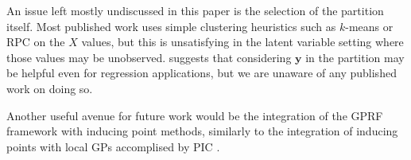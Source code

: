 \documentclass{article}
\renewcommand{\v}[1]{\mathbf{#1}}
\begin{document}
An issue left mostly undiscussed in this paper is the selection of the
partition itself. Most published work uses simple clustering
heuristics such as $k$-means \cite{tresp2000bayesian} or RPC
\cite{chalupka2012} on the $X$ values, but this is unsatisfying in the
latent variable setting where those values may be
unobserved. \cite{rasmussen2006} suggests that considering $\v{y}$ in
the partition may be helpful even for regression applications, but we
are unaware of any published work on doing so. 

Another useful avenue for future work would be the integration of the
GPRF framework with inducing point methods, similarly to the
integration of inducing points with local GPs accomplised by PIC \cite{snelson2007}.

%



\end{document}
